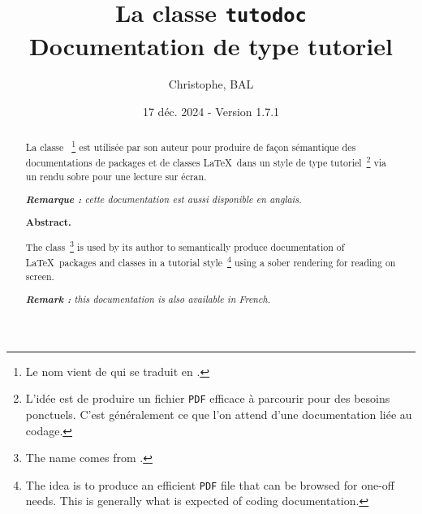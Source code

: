 \title{La classe \texttt{tutodoc} \\ Documentation de type tutoriel}
\author{Christophe, BAL}
\date{17 déc. 2024 - Version 1.7.1}

\maketitle

\begin{abstract}
    La classe \thisproj{}\,%
    \footnote{
        Le nom vient de  qui se traduit en .
    }
    est utilisée par son auteur pour produire de façon sémantique des documentations de packages et de classes \LaTeX\ dans un style de type tutoriel\,%
    \footnote{
        L'idée est de produire un fichier \texttt{PDF} efficace à parcourir pour des besoins ponctuels. C'est généralement ce que l'on attend d'une documentation liée au codage.
    }
    via un rendu sobre pour une lecture sur écran.

    \smallskip

    \noindent
    \emph{\textbf{Remarque :} cette documentation est aussi disponible en anglais.}

    \smallskip
    \tdocsep
    \small
    \itshape
    \vspace{-5pt}
    \begin{center}
        \textbf{Abstract.}
    \end{center}

    The \thisproj{} class\,%
        \footnote{
            The name comes from .
        }
        is used by its author to semantically produce documentation of \LaTeX\ packages and classes in a tutorial style\,%
        \footnote{
            The idea is to produce an efficient \texttt{PDF} file that can be browsed for one-off needs. This is generally what is expected of coding documentation.
        }
        using a sober rendering for reading on screen.
    
        \smallskip
    
        \noindent
        \emph{\textbf{Remark :} this documentation is also available in French.}
\end{abstract}

\tdocsep


